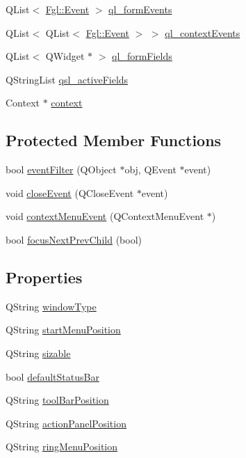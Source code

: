 \begin{DoxyCompactItemize}
\item 
QList$<$ \hyperlink{structFgl_1_1Event}{Fgl::Event} $>$ \hyperlink{classFglForm_aec60babfa521575768a4aa1147318ba1}{ql\_\-formEvents}
\item 
QList$<$ QList$<$ \hyperlink{structFgl_1_1Event}{Fgl::Event} $>$ $>$ \hyperlink{classFglForm_ac7920cda2f9ebef4076ff19e73cfa047}{ql\_\-contextEvents}
\item 
QList$<$ QWidget $\ast$ $>$ \hyperlink{classFglForm_ad0adbaabeb97d6fabd2a23f5ac5c0069}{ql\_\-formFields}
\item 
QStringList \hyperlink{classFglForm_a127a846458930510880fd13eb07d4463}{qsl\_\-activeFields}
\item 
Context $\ast$ \hyperlink{classFglForm_ad88a7b19b295fe1f14de652a9e3e1c17}{context}
\end{DoxyCompactItemize}
\subsection*{Protected Member Functions}
\begin{DoxyCompactItemize}
\item 
bool \hyperlink{classFglForm_ad684c111c48ae9b6bfee70f36383e8a0}{eventFilter} (QObject $\ast$obj, QEvent $\ast$event)
\item 
void \hyperlink{classFglForm_ab4a2e829699bf5c49124801ccd0eb5f2}{closeEvent} (QCloseEvent $\ast$event)
\item 
void \hyperlink{classFglForm_a039e7ba89ece4f1bb47c32dc34271536}{contextMenuEvent} (QContextMenuEvent $\ast$)
\item 
bool \hyperlink{classFglForm_abbb79e3d5fbc48341d4e88bc91002c22}{focusNextPrevChild} (bool)
\end{DoxyCompactItemize}
\subsection*{Properties}
\begin{DoxyCompactItemize}
\item 
QString \hyperlink{classFglForm_a5262a92dfdf82913701d4661bbefaaac}{windowType}
\item 
QString \hyperlink{classFglForm_aec7035cbd1e5a013f2d96a1a3a98aa53}{startMenuPosition}
\item 
QString \hyperlink{classFglForm_a2e26a9f76fe7c63c8103ac4b04776e81}{sizable}
\item 
bool \hyperlink{classFglForm_aed179664fb0f0999affabd3b746edae7}{defaultStatusBar}
\item 
QString \hyperlink{classFglForm_afc1641787bae0be3864cce6efdea9e17}{toolBarPosition}
\item 
QString \hyperlink{classFglForm_a8ca117823135914a8977974b455372a1}{actionPanelPosition}
\item 
QString \hyperlink{classFglForm_ab0e939affc05fa6c0297dcf7c257b25f}{ringMenuPosition}
\end{DoxyCompactItemize}
